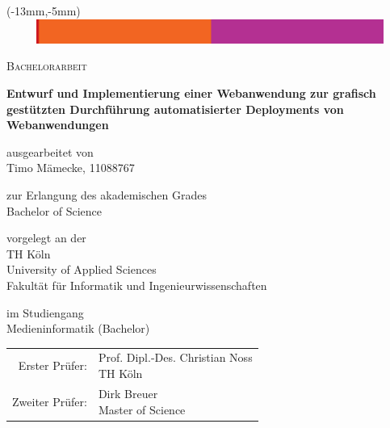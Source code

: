 \begin{titlepage}
  \enlargethispage{3cm}

  \begin{textblock*}{230mm}(-13mm,-5mm)
    \includegraphics[width=230mm,height=8mm]{./assets/topline.eps}
  \end{textblock*}


  \begin{center}
    \textsc{\large{Bachelorarbeit}}

    \vspace{0.7cm}

    \Large{\textbf{Entwurf und Implementierung einer Webanwendung zur grafisch gestützten Durchführung automatisierter Deployments von Webanwendungen}}

    \vspace{0.7cm}

    \normalsize{ausgearbeitet von} \\
    \large{Timo Mämecke, 11088767}

    \vspace{0.3cm}

    \normalsize{zur Erlangung des akademischen Grades} \\
    \large{Bachelor of Science}

    \vspace{0.3cm}

    \normalsize{vorgelegt an der} \\
    \large{
      TH Köln \\
      University of Applied Sciences \\
      Fakultät für Informatik und Ingenieurwissenschaften
    }

    \vspace{0.3cm}

    \normalsize{im Studiengang} \\
    \large{Medieninformatik (Bachelor)}

    \vspace{0.7cm}

    \normalsize{
      \begin{tabular}{ r l }
        Erster Prüfer: & \makecell[lt]{Prof. Dipl.-Des. Christian Noss\\\small{TH Köln}\vspace{0.2cm}} \\
        Zweiter Prüfer: & \makecell[lt]{Dirk Breuer\\\small{Master of Science}}
      \end{tabular}
    }


\end{center}
\end{titlepage}
